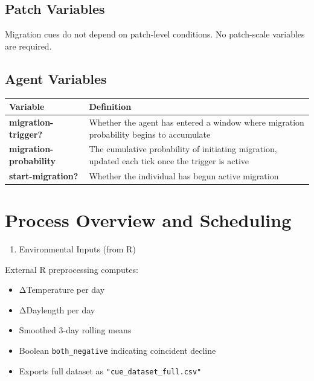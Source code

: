\documentclass[
]{book}
\providecommand{\tightlist}{%
  \setlength{\itemsep}{0pt}\setlength{\parskip}{0pt}}
\begin{document}
\subsection{Patch Variables}\label{patch-variables-3}

Migration cues do not depend on patch-level conditions. No patch-scale variables are required.

\subsection{Agent Variables}\label{agent-variables-3}

\begin{longtable}[]{@{}
  >{\raggedright\arraybackslash}p{}
  >{\raggedright\arraybackslash}p{}@{}}
\toprule\noalign{}
\begin{minipage}[b]{\linewidth}\raggedright
Variable
\end{minipage} & \begin{minipage}[b]{\linewidth}\raggedright
Definition
\end{minipage} \\
\midrule\noalign{}
\endhead
\bottomrule\noalign{}
\endlastfoot
\textbf{migration-trigger?} & Whether the agent has entered a window where migration probability begins to accumulate \\
\textbf{migration-probability} & The cumulative probability of initiating migration, updated each tick once the trigger is active \\
\textbf{start-migration?} & Whether the individual has begun active migration \\
\end{longtable}

\section{Process Overview and Scheduling}\label{process-overview-and-scheduling-3}

\begin{enumerate}
\def\labelenumi{\arabic{enumi}.}
\tightlist
\item
  Environmental Inputs (from R)
\end{enumerate}

External R preprocessing computes:

\begin{itemize}
\tightlist
\item
  ΔTemperature per day\\
\item
  ΔDaylength per day\\
\item
  Smoothed 3-day rolling means\\
\item
  Boolean \texttt{both\_negative} indicating coincident decline\\
\item
  Exports full dataset as \texttt{"cue\_dataset\_full.csv"}
\end{itemize}
\end{document}
